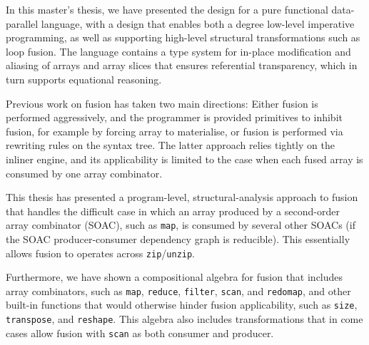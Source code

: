 In this master’s thesis, we have presented the design for a pure
functional data-parallel language, with a design that enables both a
degree low-level imperative programming, as well as supporting
high-level structural transformations such as loop fusion.  The
language contains a type system for in-place modification and aliasing
of arrays and array slices that ensures referential transparency,
which in turn supports equational reasoning.

Previous work on fusion has taken two main directions: Either fusion
is performed aggressively, and the programmer is provided primitives
to inhibit fusion, for example by forcing array to materialise, or
fusion is performed via rewriting rules on the syntax tree.  The
latter approach relies tightly on the inliner engine, and its
applicability is limited to the case when each fused array is consumed
by one array combinator.

This thesis has presented a program-level, structural-analysis
approach to fusion that handles the difficult case in which an array
produced by a second-order array combinator (SOAC), such as
\texttt{map}, is consumed by several other SOACs (if the SOAC
producer-consumer dependency graph is reducible).  This essentially
allows fusion to operates across \texttt{zip}/\texttt{unzip}.

Furthermore, we have shown a compositional algebra for fusion that
includes array combinators, such as \texttt{map}, \texttt{reduce},
\texttt{filter}, \texttt{scan}, and \texttt{redomap}, and other
built-in functions that would otherwise hinder fusion applicability,
such as \texttt{size}, \texttt{transpose}, and \texttt{reshape}.  This
algebra also includes transformations that in come cases allow fusion
with \texttt{scan} as both consumer and producer.

